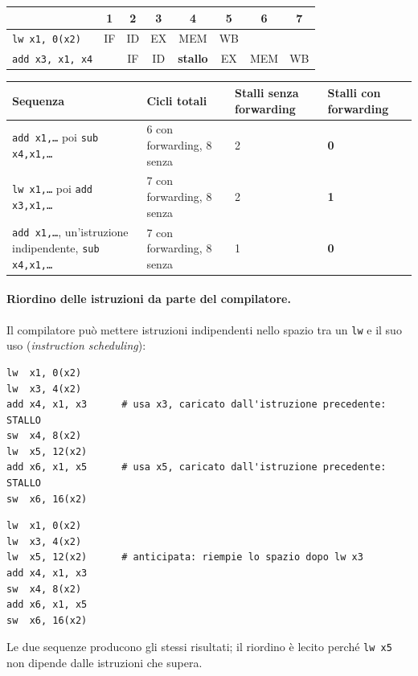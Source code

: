 \begin{center}
\small
\begin{tabular}{@{}l|ccccccc@{}}
 & 1 & 2 & 3 & 4 & 5 & 6 & 7 \\
\hline
\texttt{lw  x1, 0(x2)}  & IF & ID & EX & MEM & WB & & \\
\texttt{add x3, x1, x4} & & IF & ID & \textbf{stallo} & EX & MEM & WB \\
\end{tabular}
\end{center}

\begin{center}
\small
\begin{tabularx}{\textwidth}{@{}>{\raggedright\arraybackslash}p{4.3cm}XXX@{}}
\toprule
\textbf{Sequenza} & \textbf{Cicli totali} & \textbf{Stalli senza forwarding} & \textbf{Stalli con forwarding} \\
\midrule
\texttt{add x1,\ldots{}} poi \texttt{sub x4,x1,\ldots{}} & 6 con forwarding, 8 senza & 2 & \textbf{0} \\
\texttt{lw x1,\ldots{}} poi \texttt{add x3,x1,\ldots{}} & 7 con forwarding, 8 senza & 2 & \textbf{1} \\
\texttt{add x1,\ldots{}}, un'istruzione indipendente, \texttt{sub x4,x1,\ldots{}} & 7 con forwarding, 8 senza & 1 & \textbf{0} \\
\bottomrule
\end{tabularx}
\end{center}

\paragraph{Riordino delle istruzioni da parte del compilatore.} Il compilatore può mettere istruzioni indipendenti nello spazio tra un \texttt{lw} e il suo uso (\emph{instruction scheduling}):
\begin{lstlisting}[numbers=none, caption={Codice originale: 2 stalli, 13 cicli (con forwarding)}]
lw  x1, 0(x2)
lw  x3, 4(x2)
add x4, x1, x3      # usa x3, caricato dall'istruzione precedente: STALLO
sw  x4, 8(x2)
lw  x5, 12(x2)
add x6, x1, x5      # usa x5, caricato dall'istruzione precedente: STALLO
sw  x6, 16(x2)
\end{lstlisting}
\begin{lstlisting}[numbers=none, caption={Codice riordinato: 0 stalli, 11 cicli}]
lw  x1, 0(x2)
lw  x3, 4(x2)
lw  x5, 12(x2)      # anticipata: riempie lo spazio dopo lw x3
add x4, x1, x3
sw  x4, 8(x2)
add x6, x1, x5
sw  x6, 16(x2)
\end{lstlisting}
Le due sequenze producono gli stessi risultati; il riordino è lecito perché \texttt{lw x5} non dipende dalle istruzioni che supera.

